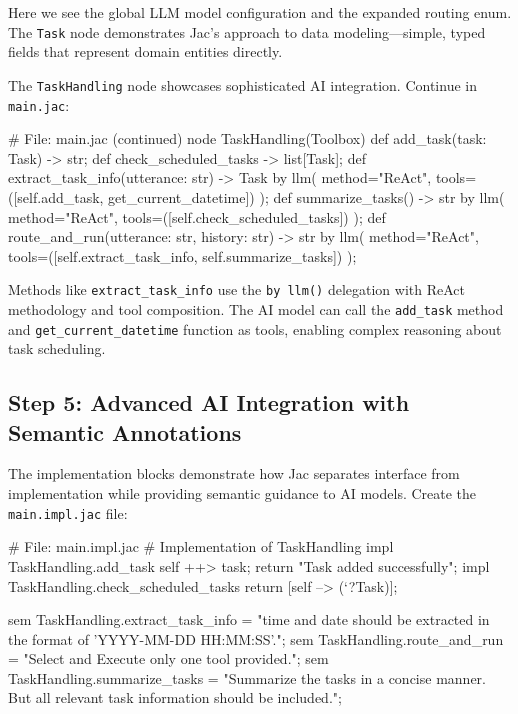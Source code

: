 Here we see the global LLM model configuration and the expanded routing enum. The \texttt{Task} node demonstrates Jac's approach to data modeling—simple, typed fields that represent domain entities directly.

The \texttt{TaskHandling} node showcases sophisticated AI integration. Continue in \texttt{main.jac}:

\begin{jacblock}
# File: main.jac (continued)
node TaskHandling(Toolbox) {
    def add_task(task: Task) -> str;
    def check_scheduled_tasks -> list[Task];
    def extract_task_info(utterance: str) -> Task by llm(
        method="ReAct",
        tools=([self.add_task, get_current_datetime])
    );
    def summarize_tasks() -> str by llm(
        method="ReAct",
        tools=([self.check_scheduled_tasks])
    );
    def route_and_run(utterance: str, history: str) -> str by llm(
        method="ReAct",
        tools=([self.extract_task_info, self.summarize_tasks])
    );
}
\end{jacblock}

Methods like \texttt{extract\_task\_info} use the \texttt{by llm()} delegation with ReAct methodology and tool composition. The AI model can call the \texttt{add\_task} method and \texttt{get\_current\_datetime} function as tools, enabling complex reasoning about task scheduling.

\subsection{Step 5: Advanced AI Integration with Semantic Annotations}

The implementation blocks demonstrate how Jac separates interface from implementation while providing semantic guidance to AI models. Create the \texttt{main.impl.jac} file:

\begin{jacblock}
# File: main.impl.jac
# Implementation of TaskHandling
impl TaskHandling.add_task {
    self ++> task;
    return "Task added successfully";
}
impl TaskHandling.check_scheduled_tasks {
    return [self --> (`?Task)];
}

sem TaskHandling.extract_task_info = "time and date should be extracted in the format of 'YYYY-MM-DD HH:MM:SS'.";
sem TaskHandling.route_and_run = "Select and Execute only one tool provided.";
sem TaskHandling.summarize_tasks = "Summarize the tasks in a concise manner. But all relevant task information should be included.";
\end{jacblock}

